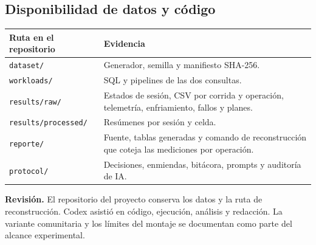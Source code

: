 \documentclass[10pt,a4paper]{article}
\newcommand{\clave}[1]{\texttt{#1}}
\begin{document}
\subsection{Disponibilidad de datos y código}
\begin{tabularx}{\linewidth}{@{}lX@{}}
\toprule Ruta en el repositorio & Evidencia\\
\midrule
\clave{dataset/} & Generador, semilla y manifiesto SHA-256.\\
\clave{workloads/} & SQL y pipelines de las dos consultas.\\
\clave{results/raw/} & Estados de sesión, CSV por corrida y operación, telemetría, enfriamiento, fallos y planes.\\
\clave{results/processed/} & Resúmenes por sesión y celda.\\
\clave{reporte/} & Fuente, tablas generadas y comando de reconstrucción que coteja las mediciones por operación.\\
\clave{protocol/} & Decisiones, enmiendas, bitácora, prompts y auditoría de IA.\\
\bottomrule
\end{tabularx}

\textbf{Revisión.} El repositorio del proyecto conserva los datos y la ruta de reconstrucción. Codex asistió en código, ejecución, análisis y redacción. La variante comunitaria y los límites del montaje se documentan como parte del alcance experimental.
\end{document}
